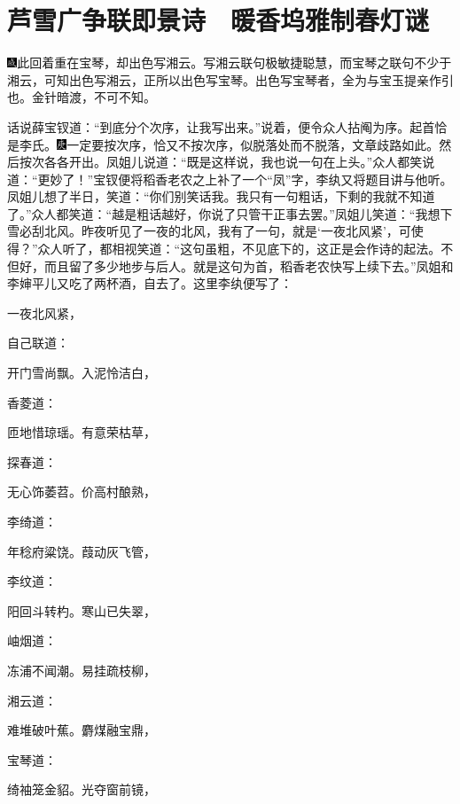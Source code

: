 

\chapter{芦雪广争联即景诗　暖香坞雅制春灯谜}\label{part0054_split_000.htmlux5cux23calibre_pb_0}

{\includegraphics[width=3mm]{../Images/00005}此回着重在宝琴，却出色写湘云。写湘云联句极敏捷聪慧，而宝琴之联句不少于湘云，可知出色写湘云，正所以出色写宝琴。出色写宝琴者，全为与宝玉提亲作引也。金针暗渡，不可不知。}

话说薛宝钗道：``到底分个次序，让我写出来。''说着，便令众人拈阄为序。起首恰是李氏。{\includegraphics[width=3mm]{../Images/00004}一定要按次序，恰又不按次序，似脱落处而不脱落，文章歧路如此。}然后按次各各开出。凤姐儿说道：``既是这样说，我也说一句在上头。''众人都笑说道：``更妙了！''宝钗便将稻香老农之上补了一个``凤''字，李纨又将题目讲与他听。凤姐儿想了半日，笑道：``你们别笑话我。我只有一句粗话，下剩的我就不知道了。''众人都笑道：``越是粗话越好，你说了只管干正事去罢。''凤姐儿笑道：``我想下雪必刮北风。昨夜听见了一夜的北风，我有了一句，就是`一夜北风紧'，可使得？''众人听了，都相视笑道：``这句虽粗，不见底下的，这正是会作诗的起法。不但好，而且留了多少地步与后人。就是这句为首，稻香老农快写上续下去。''凤姐和李婶平儿又吃了两杯酒，自去了。这里李纨便写了：

一夜北风紧，

自己联道：

开门雪尚飘。入泥怜洁白，

香菱道：

匝地惜琼瑶。有意荣枯草，

探春道：

无心饰萎苕。价高村酿熟，

李绮道：

年稔府粱饶。葭动灰飞管，

李纹道：

阳回斗转杓。寒山已失翠，

岫烟道：

冻浦不闻潮。易挂疏枝柳，

湘云道：

难堆破叶蕉。麝煤融宝鼎，

宝琴道：

绮袖笼金貂。光夺窗前镜，

